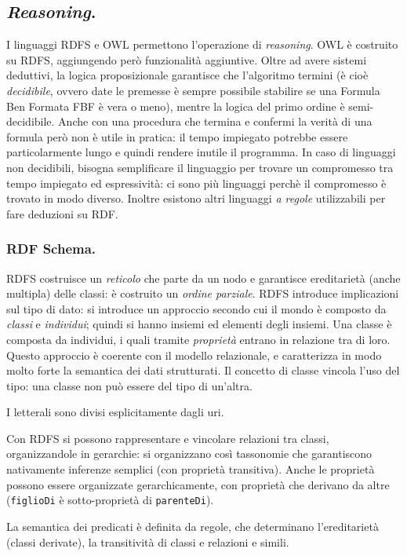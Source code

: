 \documentclass[11pt]{article}
\begin{document}
\begin{multicols}{2}
\subsection{\textit{Reasoning}.}
I linguaggi RDFS e OWL permettono l'operazione di \textit{reasoning}.
OWL è costruito su RDFS, aggiungendo però funzionalità aggiuntive.
Oltre ad avere sistemi deduttivi, la logica proposizionale garantisce che l'algoritmo termini (è cioè \textit{decidibile}, ovvero date le premesse è sempre possibile stabilire se una Formula Ben Formata FBF è vera o meno), mentre la logica del primo ordine è semi-decidibile.
Anche con una procedura che termina e confermi la verità di una formula però non è utile in pratica: il tempo impiegato potrebbe essere particolarmente lungo e quindi rendere inutile il programma.
In caso di linguaggi non decidibili, bisogna semplificare il linguaggio per trovare un compromesso tra tempo impiegato ed espressività: ci sono più linguaggi perchè il compromesso è trovato in modo diverso.
Inoltre esistono altri linguaggi \textit{a regole} utilizzabili per fare deduzioni su RDF.

\subsubsection{RDF Schema.}
RDFS costruisce un \textit{reticolo} che parte da un nodo e garantisce ereditarietà (anche multipla) delle classi: è costruito un \textit{ordine parziale}.
RDFS introduce implicazioni sul tipo di dato: si introduce un approccio secondo cui il mondo è composto da \textit{classi} e \textit{individui}; quindi si hanno insiemi ed elementi degli insiemi.
Una classe è composta da individui, i quali tramite \textit{proprietà} entrano in relazione tra di loro.
Questo approccio è coerente con il modello relazionale, e caratterizza in modo molto forte la semantica dei dati strutturati.
Il concetto di classe vincola l'uso del tipo: una classe non può essere del tipo di un'altra.

I letterali sono divisi esplicitamente dagli uri.

Con RDFS si possono rappresentare e vincolare relazioni tra classi, organizzandole in gerarchie: si organizzano così tassonomie che garantiscono nativamente inferenze semplici (con proprietà transitiva).
Anche le proprietà possono essere organizzate gerarchicamente, con proprietà che derivano da altre (\verb|figlioDi| è sotto-proprietà di \verb|parenteDi|).

La semantica dei predicati è definita da regole, che determinano l'ereditarietà (classi derivate), la transitività di classi e relazioni e simili.


\end{multicols}
\end{document}
